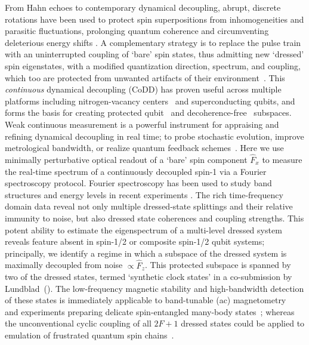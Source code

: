\documentclass[aps,prl,reprint,superscriptaddress,floatfix]{revtex4-1}
\begin{document}
From Hahn echoes to contemporary dynamical decoupling, abrupt, discrete rotations have been used to protect spin superpositions from inhomogeneities and parasitic fluctuations, prolonging quantum coherence and circumventing deleterious energy shifts \cite{biercuk_optimized_2009,lange_universal_2010,bluhm_dephasing_2011}.
A complementary strategy is to replace the pulse train with an uninterrupted coupling of `bare' spin states, thus admitting new `dressed' spin eigenstates, with a modified quantization direction, spectrum, and coupling, which too are protected from unwanted artifacts of their environment~\cite{fanchini_continuously_2007}.
This \textit{continuous} dynamical decoupling (CoDD) has proven useful across multiple platforms including nitrogen-vacancy centers~\cite{hirose_continuous_2012,loretz_radio-frequency_2013,cai_robust_2012,*cai_long-lived_2012,golter_protecting_2014} and superconducting qubits, and forms the basis for creating protected qubit~\cite{aharon_general_2013} and decoherence-free~\cite{facchi_quantum_2002,*facchi_unification_2004} subspaces.
Weak continuous measurement is a powerful instrument for appraising and refining dynamical decoupling in real time; to probe stochastic evolution, improve metrological bandwidth, or realize quantum feedback schemes~\cite{vijay_stabilizing_2012}.
Here we use minimally perturbative  optical readout of a `bare' spin component $\hat{F}_x$ to measure the real-time spectrum of a continuously decoupled spin-1 via a Fourier spectroscopy protocol. Fourier spectroscopy has been used to study band structures and energy levels in recent experiments \cite{valdes-curiel_fourier_2017}.
The rich time-frequency domain data reveal not only multiple dressed-state splittings and their relative immunity to noise, but also dressed state coherences and coupling strengths.
This potent ability to estimate the eigenspectrum of a multi-level dressed system reveals feature absent in spin-1/2 or composite spin-1/2 qubit systems; principally, we identify a regime in which a subspace of the dressed system is maximally decoupled from noise $\propto \hat{F}_z$.
This protected  subspace is spanned by two of the dressed states, termed `synthetic clock states' in a co-submission by Lundblad~\etal (\lundblad).
The low-frequency magnetic stability and high-bandwidth detection of these states is immediately applicable to band-tunable (ac) magnetometry~\cite{hirose_continuous_2012,loretz_radio-frequency_2013,ockeloen_quantum_2013,*horsley_frequency-tunable_2016} and experiments preparing delicate spin-entangled many-body states~\cite{stamper-kurn_spinor_2013}; whereas the unconventional cyclic coupling of all $2F+1$ dressed states could be applied to emulation of frustrated quantum spin chains~\cite{mikeska_one-dimensional_2004}.
\end{document}
